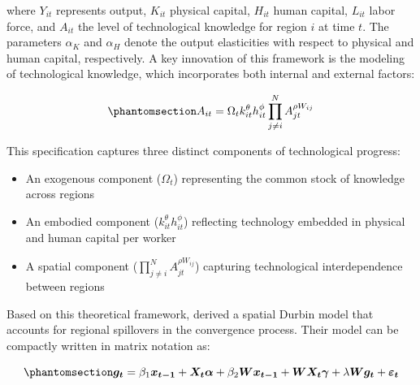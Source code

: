 \documentclass[
  a4paper, 
  twoside,
  review
]{article}
\providecommand{\tightlist}{%
  \setlength{\itemsep}{0pt}\setlength{\parskip}{0pt}}
\begin{document}
where \(Y_{it}\) represents output, \(K_{it}\) physical capital,
\(H_{it}\) human capital, \(L_{it}\) labor force, and \(A_{it}\) the
level of technological knowledge for region \(i\) at time \(t\). The
parameters \(\alpha_K\) and \(\alpha_H\) denote the output elasticities
with respect to physical and human capital, respectively. A key
innovation of this framework is the modeling of technological knowledge,
which incorporates both internal and external factors:

\begin{equation}\phantomsection\label{eq-technology}{
A_{i t}=\Omega_{t} k_{i t}^{\theta} h_{i t}^{\phi} \prod_{j \neq i}^{N} A_{j t}^{\rho W_{i j}}
}\end{equation}

This specification captures three distinct components of technological
progress:

\begin{itemize}
\tightlist
\item
  An exogenous component (\(\Omega_t\)) representing the common stock of
  knowledge across regions
\item
  An embodied component (\(k_{i t}^{\theta} h_{i t}^{\phi}\)) reflecting
  technology embedded in physical and human capital per worker
\item
  A spatial component (\(\prod_{j \neq i}^{N} A_{j t}^{\rho W_{i j}}\))
  capturing technological interdependence between regions
\end{itemize}

Based on this theoretical framework, \citet{ertur_koch_spatial_growth}
derived a spatial Durbin model that accounts for regional spillovers in
the convergence process. Their model can be compactly written in matrix
notation as:

\begin{equation}\phantomsection\label{eq-matrix_form}{
\boldsymbol{g_t} =  \beta_1 \boldsymbol{x_{t-1}} + \boldsymbol{X_t} \boldsymbol{\alpha} + \beta_2 \boldsymbol{W} \boldsymbol{x_{t-1}} + \boldsymbol{W} \boldsymbol{X_t} \boldsymbol{\gamma} + \lambda \boldsymbol{W} \boldsymbol{g_t}  + \boldsymbol{\varepsilon_t}
}\end{equation}
\end{document}
